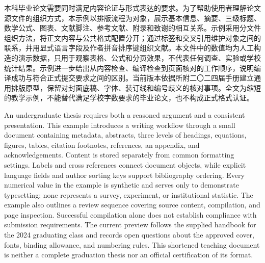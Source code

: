 \begin{cuebabstract}
本科毕业论文需要同时满足内容论证与形式表达的要求。为了帮助使用者理解论文源文件的组织方式，本示例以排版流程为对象，展示基本信息、摘要、三级标题、数学公式、图表、文献脚注、参考文献、附录和致谢的相互关系。示例采用分文件组织方法，将正文内容与公共格式配置分开；通过标签和交叉引用维护对象之间的联系，并用显式语言字段及作者拼音排序键组织文献。本文件中的数值均为人工构造的演示数据，只用于观察表格、公式和分页效果，不代表任何调查、实验或学校统计结果。示例进一步给出从内容检查、编译检查到页面核对的工作顺序，说明编译成功与符合正式提交要求之间的区别。当前版本依据所附二〇二四届手册建立通用排版原型，保留对封面底稿、字体、装订线和编号歧义的核对事项。全文为缩短的教学示例，不能替代满足学校字数要求的毕业论文，也不构成正式格式认证。
\end{cuebabstract}

\begin{cuebabstract*}
An undergraduate thesis requires both a reasoned argument and a consistent presentation. This example introduces a writing workflow through a small document containing metadata, abstracts, three levels of headings, equations, figures, tables, citation footnotes, references, an appendix, and acknowledgements. Content is stored separately from common formatting settings. Labels and cross references connect document objects, while explicit language fields and author sorting keys support bibliography ordering. Every numerical value in the example is synthetic and serves only to demonstrate typesetting; none represents a survey, experiment, or institutional statistic. The example also outlines a review sequence covering source content, compilation, and page inspection. Successful compilation alone does not establish compliance with submission requirements. The current preview follows the supplied handbook for the 2024 graduating class and records open questions about the approved cover, fonts, binding allowance, and numbering rules. This shortened teaching document is neither a complete graduation thesis nor an official certification of its format.
\end{cuebabstract*}
